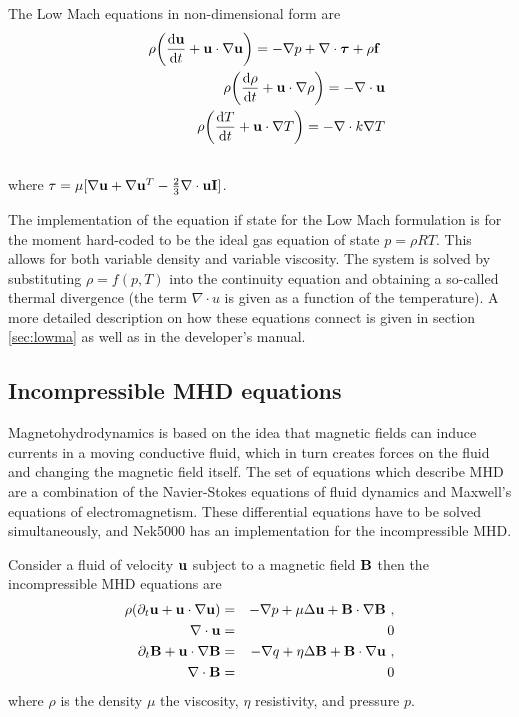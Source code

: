 The Low Mach equations in non-dimensional form are 
\begin{eqnarray}
&&\rho\bigg(\frac{\mathrm{d} \mathbf{u}}{\mathrm{d} t}+ \mathbf{u}\cdot\nabla\mathbf{u}\bigg)=-\nabla p+\nabla \cdot\boldsymbol{\tau}+\rho\mathbf{f}\ \\ \nonumber
&&\rho\bigg(\frac{\mathrm{d} \mathbf{\rho}}{\mathrm{d} t}+ \mathbf{u}\cdot\nabla\mathbf{\rho}\bigg)=-\nabla \cdot \mathbf{u}\\ \nonumber
&&\rho\bigg(\frac{\mathrm{d} T}{\mathrm{d} t}+ \mathbf{u}\cdot\nabla T\bigg)=-\nabla \cdot k \nabla T\\ \nonumber
\end{eqnarray}
where $\tau=\mu[\nabla \mathbf{u}+\nabla \mathbf{u}^{T}-\frac{2}{3}\nabla \cdot \mathbf{u} \mathbf{I}]$.


The implementation of the equation if state for the Low Mach formulation is for the moment hard-coded to be the ideal gas equation of state $p=\rho R T$. This allows for both variable density and variable viscosity. The system is solved by substituting $\rho=f(p,T)$ into the continuity equation and obtaining a so-called thermal divergence (the term $\nabla \cdot u$ is given as a function of the temperature).
A more detailed description on how these equations connect is given in section \ref{sec:lowma} as well as in the developer's manual.

\subsection*{Incompressible MHD equations}\label{sec:mhd}
Magnetohydrodynamics is based on the idea that magnetic fields can induce currents in a moving conductive fluid, which in turn creates forces on the fluid and changing the magnetic field itself. The set of equations which describe MHD are a combination of the Navier-Stokes equations of fluid dynamics and Maxwell's equations of electromagnetism. These differential equations have to be solved simultaneously, and Nek5000 has an implementation for the incompressible MHD.

Consider a fluid of velocity $\mathbf{u}$ subject to a magnetic field $\mathbf{B}$ then the incompressible MHD equations are
\begin{eqnarray}
 \rho(\partial_{t} {\bf u} + {\bf u} \cdot \nabla {\bf u}) &=& - \nabla p + \mu \Delta {\bf u} + {\bf B}\cdot \nabla {\bf B} \ ,\\ 
 \nabla \cdot {\bf u} & =& 0\\ \nonumber
   \partial_{t} {\bf B} + {\bf u} \cdot \nabla {\bf B} &=& - \nabla q + \eta \Delta {\bf B} + {\bf B}\cdot \nabla {\bf u} \ ,\\ 
    \nabla \cdot {\bf B} & =& 0 \nonumber
\end{eqnarray}
where $\rho$ is the density $\mu$ the viscosity, $\eta$ resistivity, and pressure $p$.


